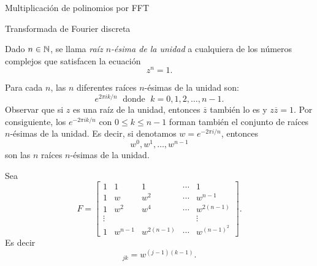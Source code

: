 \begin{chapter}{Multiplicación de polinomios por FFT}
\begin{section}{Transformada de Fourier discreta}
        \begin{definicion}
            Dado $n \in \mathbb N$, se llama \textit{raíz $n$-ésima de la unidad} a cualquiera de los números complejos que satisfacen la ecuación 
            $$
            z^n = 1.
            $$ 
        \end{definicion}

        Para cada $n$, las $n$ diferentes raíces $n$-ésimas de la unidad son:
        $$
        e^{2 \pi i k/n} \;\text{ donde }\;  k = 0, 1, 2, \ldots, n-1.
        $$
        Observar que si $z$ es una raíz de la unidad, entonces $\overline{z}$ también lo es y $z\overline{z} =1$.  Por consiguiente, los $e^{-2 \pi i k/n}$ con $0 \le k \le n-1$ forman también el conjunto de raíces $n$-ésimas de la unidad. Es decir, si denotamos $w = e^{-2 \pi i/n}$, entonces 
        $$
        w^0, w^1,\ldots,w^{n-1} 
        $$ son las $n$ raíces $n$-ésimas de la unidad.

        Sea
        \begin{equation*}
            F = \begin{bmatrix}
                1 & 1 & 1 & \cdots & 1 \\
                1 & w & w^2 & \cdots & w^{n-1} \\
                1 & w^2 & w^4 & \cdots & w^{2(n-1)} 
                \\ \vdots & &  &  &\vdots \\
                1 & w^{n-1} &w^{2(n-1)} & \cdots & w^{(n-1)^2} 
            \end{bmatrix}.
        \end{equation*}
        Es decir 
        \begin{equation*}
            [F]_{jk} = w^{(j-1)(k-1)}.
        \end{equation*}



\end{section}
\end{chapter}
